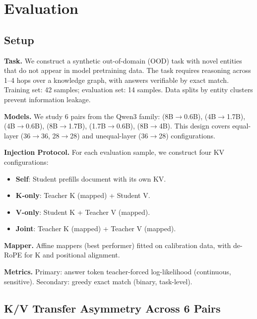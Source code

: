 
\section{Evaluation}
\label{sec:results}

\subsection{Setup}

\textbf{Task.}
We construct a synthetic out-of-domain (OOD) task with novel entities
that do not appear in model pretraining data.
The task requires reasoning across 1--4 hops over a knowledge graph,
with answers verifiable by exact match.
Training set: 42 samples; evaluation set: 14 samples.
Data splits by entity clusters prevent information leakage.

\textbf{Models.}
We study 6 pairs from the Qwen3 family:
(8B$\to$0.6B), (4B$\to$1.7B), (4B$\to$0.6B),
(8B$\to$1.7B), (1.7B$\to$0.6B), (8B$\to$4B).
This design covers equal-layer (36$\to$36, 28$\to$28) and
unequal-layer (36$\to$28) configurations.

\textbf{Injection Protocol.}
For each evaluation sample, we construct four KV configurations:
\begin{itemize}
  \item \textbf{Self}: Student prefills document with its own KV.
  \item \textbf{K-only}: Teacher K (mapped) + Student V.
  \item \textbf{V-only}: Student K + Teacher V (mapped).
  \item \textbf{Joint}: Teacher K (mapped) + Teacher V (mapped).
\end{itemize}

\textbf{Mapper.}
Affine mappers (best performer) fitted on calibration data,
with de-RoPE for K and positional alignment.

\textbf{Metrics.}
Primary: answer token teacher-forced log-likelihood (continuous, sensitive).
Secondary: greedy exact match (binary, task-level).

\subsection{K/V Transfer Asymmetry Across 6 Pairs}

